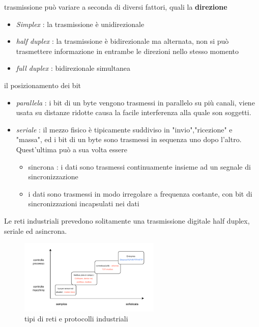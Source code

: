 \documentclass[10pt, letterpaper]{report}
\begin{document}
trasmissione può variare a seconda di diversi fattori, 
quali la \textbf{direzione}\begin{itemize}
    \item \textit{Simplex} : la trasmissione è unidirezionale 
    \item \textit{half duplex} : la trasmissione è bidirezionale ma 
    alternata, non si può trasmettere informazione in entrambe le direzioni 
    nello stesso momento
    \item \textit{full duplex} : bidirezionale simultanea 
\end{itemize}
il posizionamento dei bit\begin{itemize}
    \item \textit{parallela} : i bit di un byte vengono trasmessi 
    in parallelo su più canali, viene usata su distanze ridotte causa la 
    facile interferenza alla quale son soggetti.
    \item \textit{seriale} : il mezzo fisico è tipicamente 
    suddiviso in "invio","ricezione" e "massa", ed i bit di un byte 
    sono trasmessi in sequenza uno dopo l'altro. Quest'ultima può 
    a sua volta essere\begin{itemize}
        \item sincrona : i dati sono trasmessi continuamente insieme 
        ad un segnale di sincronizzazione 
        \item i dati sono trasmessi in modo irregolare a frequenza costante, 
        con bit di sincronizzazioni incapsulati nei dati 
    \end{itemize}
\end{itemize}
Le reti industriali prevedono solitamente una trasmissione digitale 
half duplex, seriale ed asincrona.\\\begin{figure}[h!]
    \centering
    \includegraphics[width=0.6\textwidth ]{images/protocolliReti.pdf}
    \caption{tipi di reti e protocolli industriali}
\end{figure}\\
\end{document}
